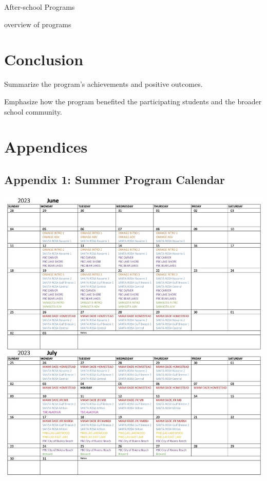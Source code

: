 \documentclass[
]{article}
\begin{document}
After-school Programs

overview of programs

\hypertarget{conclusion}{%
\section{Conclusion}\label{conclusion}}

Summarize the program's achievements and positive outcomes.

Emphasize how the program benefited the participating students and the
broader school community.

\pagebreak

\hypertarget{appendices}{%
\section{Appendices}\label{appendices}}

\hypertarget{appendix-1-summer-program-calendar}{%
\subsection{Appendix 1: Summer Program
Calendar}\label{appendix-1-summer-program-calendar}}

\includegraphics[width=1\textwidth,height=\textheight]{Images/GGEE_23_Calendar.jpg}
\end{document}
